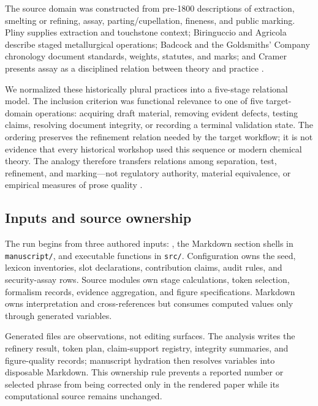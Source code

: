 \documentclass[
  english,
]{article}
\begin{document}
The source domain was constructed from pre-1800 descriptions of
extraction, smelting or refining, assay, parting/cupellation, fineness,
and public marking. Pliny supplies extraction and touchstone context;
Biringuccio and Agricola describe staged metallurgical operations;
Badcock and the Goldsmiths' Company chronology document standards,
weights, statutes, and marks; and Cramer presents assay as a disciplined
relation between theory and practice
\citep{pliny_natural_history_33, biringuccio_pirotechnia_1540, agricola_de_re_metallica_1556, badcock_touchstone_1678, goldsmiths_hallmarking_history, cramer_assaying_metals_1741}.

We normalized these historically plural practices into a five-stage
relational model. The inclusion criterion was functional relevance to
one of five target-domain operations: acquiring draft material, removing
evident defects, testing claims, resolving document integrity, or
recording a terminal validation state. The ordering preserves the
refinement relation needed by the target workflow; it is not evidence
that every historical workshop used this sequence or modern chemical
theory. The analogy therefore transfers relations among separation,
test, refinement, and marking---not regulatory authority, material
equivalence, or empirical measures of prose quality
\citep{gentner1983structure, hesse1966models}.

\subsection{Inputs and source
ownership}\label{inputs-and-source-ownership}

The run begins from three authored inputs:
, the Markdown section shells in
\texttt{manuscript/}, and executable functions in \texttt{src/}.
Configuration owns the seed, lexicon inventories, slot declarations,
contribution claims, audit rules, and security-assay rows. Source
modules own stage calculations, token selection, formalism records,
evidence aggregation, and figure specifications. Markdown owns
interpretation and cross-references but consumes computed values only
through generated variables.

Generated files are observations, not editing surfaces. The analysis
writes the refinery result, token plan, claim-support registry,
integrity summaries, and figure-quality records; manuscript hydration
then resolves variables into disposable Markdown. This ownership rule
prevents a reported number or selected phrase from being corrected only
in the rendered paper while its computational source remains unchanged.
\end{document}
